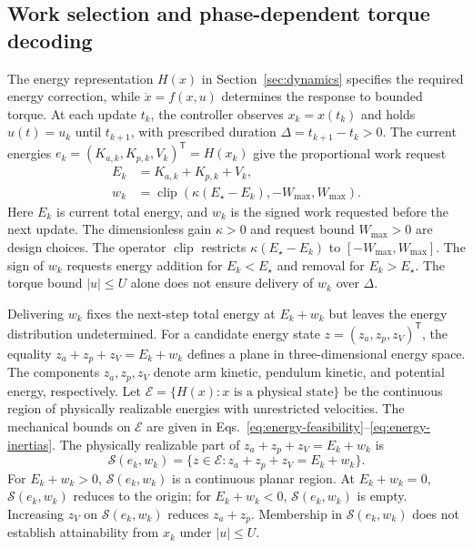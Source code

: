 \documentclass[letterpaper,10pt,conference]{ieeeconf}
\newcommand{\Estar}{E_{\star}}
\begin{document}
\subsection{Work selection and phase-dependent torque decoding}
\label{sec:contorller}
The energy representation $H(x)$ in Section~\ref{sec:dynamics} specifies the required energy correction, while $\dot x=f(x,u)$ determines the response to bounded torque. At each update $t_k$, the controller observes $x_k=x(t_k)$ and holds $u(t)=u_k$ until $t_{k+1}$, with prescribed duration $\Delta=t_{k+1}-t_k>0$. The current energies $e_k=(K_{a,k},K_{p,k},V_k)^{\mathsf T}=H(x_k)$ give the proportional work request
\begin{equation}
\begin{aligned}
 E_k&=K_{a,k}+K_{p,k}+V_k,\\
 w_k&=\operatorname{clip}\!\left(\kappa(\Estar-E_k),-W_{\max},W_{\max}\right).
\end{aligned}
\label{eq:workpolicy}
\end{equation}
Here $E_k$ is current total energy, and $w_k$ is the signed work requested before the next update. The dimensionless gain $\kappa>0$ and request bound $W_{\max}>0$ are design choices. The operator $\operatorname{clip}$ restricts $\kappa(\Estar-E_k)$ to $[-W_{\max},W_{\max}]$. The sign of $w_k$ requests energy addition for $E_k<\Estar$ and removal for $E_k>\Estar$. The torque bound $|u|\le U$ alone does not ensure delivery of $w_k$ over $\Delta$.

Delivering $w_k$ fixes the next-step total energy at $E_k+w_k$ but leaves the energy distribution undetermined. For a candidate energy state $z=(z_a,z_p,z_V)^{\mathsf T}$, the equality $z_a+z_p+z_V=E_k+w_k$ defines a plane in three-dimensional energy space. The components $z_a,z_p,z_V$ denote arm kinetic, pendulum kinetic, and potential energy, respectively. Let $\mathcal E=\{H(x):x\text{ is a physical state}\}$ be the continuous region of physically realizable energies with unrestricted velocities. The mechanical bounds on $\mathcal E$ are given in Eqs.~\eqref{eq:energy-feasibility}--\eqref{eq:energy-inertias}. The physically realizable part of $z_a+z_p+z_V=E_k+w_k$ is
\begin{equation}
 \mathcal S(e_k,w_k)=\{z\in\mathcal E:z_a+z_p+z_V=E_k+w_k\}.
 \label{eq:surface}
\end{equation}
For $E_k+w_k>0$, $\mathcal S(e_k,w_k)$ is a continuous planar region. At $E_k+w_k=0$, $\mathcal S(e_k,w_k)$ reduces to the origin; for $E_k+w_k<0$, $\mathcal S(e_k,w_k)$ is empty. Increasing $z_V$ on $\mathcal S(e_k,w_k)$ reduces $z_a+z_p$. Membership in $\mathcal S(e_k,w_k)$ does not establish attainability from $x_k$ under $|u|\le U$.
\end{document}
